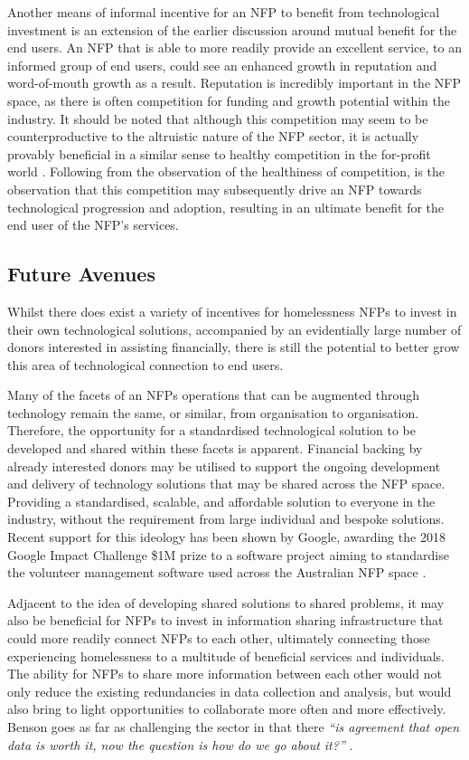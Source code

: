 Another means of informal incentive for an NFP to benefit from technological investment is an extension of the earlier discussion around mutual benefit for the end users. An NFP that is able to more readily provide an excellent service, to an informed group of end users, could see an enhanced growth in reputation and word-of-mouth growth as a result. Reputation is incredibly important in the NFP space, as there is often competition for funding and growth potential within the industry. It should be noted that although this competition may seem to be counterproductive to the altruistic nature of the NFP sector, it is actually provably beneficial in a similar sense to healthy competition in the for-profit world \cite{philipson2009antitrust}. Following from the observation of the healthiness of competition, is the observation that this competition may subsequently drive an NFP towards technological progression and adoption, resulting in an ultimate benefit for the end user of the NFP's services.

\subsection{Future Avenues}

Whilst there does exist a variety of incentives for homelessness NFPs to invest in their own technological solutions, accompanied by an evidentially large number of donors interested in assisting financially, there is still the potential to better grow this area of technological connection to end users.

Many of the facets of an NFPs operations that can be augmented through technology remain the same, or similar, from organisation to organisation. Therefore, the opportunity for a standardised technological solution to be developed and shared within these facets is apparent. Financial backing by already interested donors may be utilised to support the ongoing development and delivery of technology solutions that may be shared across the NFP space. Providing a standardised, scalable, and affordable solution to everyone in the industry, without the requirement from large individual and bespoke solutions. Recent support for this ideology has been shown by Google, awarding the 2018 Google Impact Challenge \$1M prize to a software project aiming to standardise the volunteer management software used across the Australian NFP space \cite{osa2018}.

Adjacent to the idea of developing shared solutions to shared problems, it may also be beneficial for NFPs to invest in information sharing infrastructure that could more readily connect NFPs to each other, ultimately connecting those experiencing homelessness to a multitude of beneficial services and individuals. The ability for NFPs to share more information between each other would not only reduce the existing redundancies in data collection and analysis, but would also bring to light opportunities to collaborate more often and more effectively. Benson goes as far as challenging the sector in that there \emph{“is agreement that open data is worth it, now the question is how do we go about it?”} \cite[p.~2]{van2015open}.

